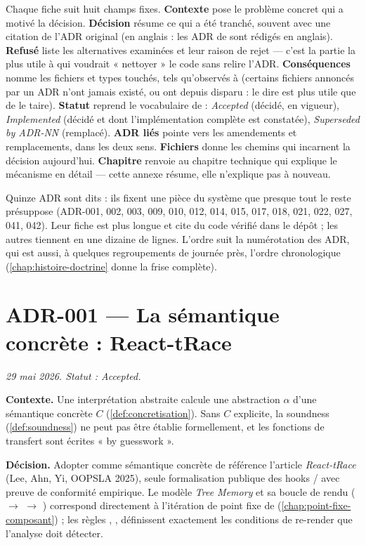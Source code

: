 Chaque fiche suit huit champs fixes. \textbf{Contexte} pose le problème
concret qui a motivé la décision. \textbf{Décision} résume ce qui a été
tranché, souvent avec une citation de l'ADR original (en anglais : les ADR de
\reactant{} sont rédigés en anglais). \textbf{Refusé} liste les alternatives
examinées et leur raison de rejet — c'est la partie la plus utile à qui
voudrait « nettoyer » le code sans relire l'ADR. \textbf{Conséquences} nomme
les fichiers et types touchés, tels qu'observés à \code{\snapshotCommit}
(certains fichiers annoncés par un ADR n'ont jamais existé, ou ont depuis
disparu : le dire est plus utile que de le taire). \textbf{Statut} reprend le
vocabulaire de  : \emph{Accepted} (décidé, en
vigueur), \emph{Implemented} (décidé et dont l'implémentation complète est
constatée), \emph{Superseded by ADR-NN} (remplacé). \textbf{ADR liés} pointe
vers les amendements et remplacements, dans les deux sens. \textbf{Fichiers}
donne les chemins qui incarnent la décision aujourd'hui. \textbf{Chapitre}
renvoie au chapitre technique qui explique le mécanisme en détail — cette
annexe résume, elle n'explique pas à nouveau.

Quinze ADR sont dits  : ils fixent une pièce du système
que presque tout le reste présuppose (ADR-001, 002, 003, 009, 010, 012, 014,
015, 017, 018, 021, 022, 027, 041, 042). Leur fiche est plus longue et cite du
code  vérifié dans le dépôt ; les autres tiennent en une dizaine de
lignes. L'ordre suit la numérotation des ADR, qui est aussi, à quelques
regroupements de journée près, l'ordre chronologique (\cref{chap:histoire-doctrine}
donne la frise complète).

\section{ADR-001 --- La sémantique concrète : React-tRace}
\label{adr:1}
\noindent\textit{29 mai 2026. Statut : Accepted.}

\textbf{Contexte.} Une interprétation abstraite calcule une abstraction $\alpha$
d'une sémantique concrète $C$ (\cref{def:concretisation}). Sans $C$ explicite,
la soundness (\cref{def:soundness}) ne peut pas être établie formellement, et
les fonctions de transfert sont écrites « by guesswork ».

\textbf{Décision.} Adopter comme sémantique concrète de référence l'article
\emph{React-tRace} \cite{LeeAhnYi2025} (Lee, Ahn, Yi, OOPSLA 2025), seule
formalisation publique des hooks / avec preuve
de conformité empirique. Le modèle \emph{Tree Memory} et sa boucle de rendu
( $\to$  $\to$ ) correspond
directement à l'itération de point fixe de \reactant{} (\cref{chap:point-fixe-composant}) ;
les règles , , 
définissent exactement les conditions de re-render que l'analyse doit
détecter.

